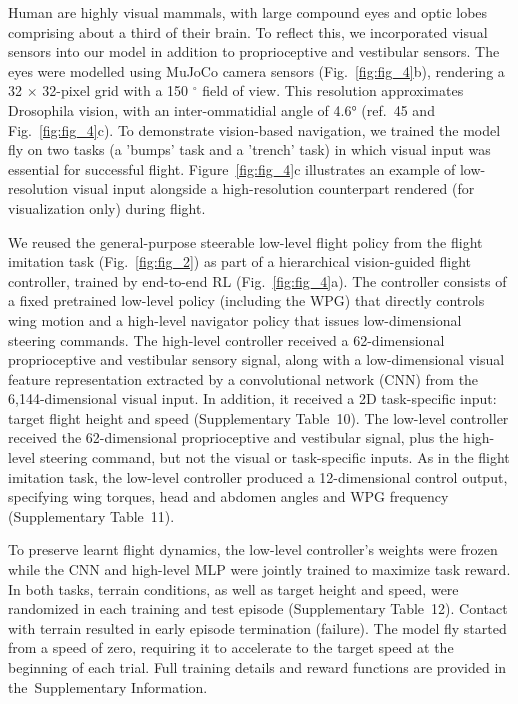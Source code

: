 \documentclass[sn-mathphys-num]{sn-jnl}%
\theoremstyle{thmstyleone}	%
\theoremstyle{thmstyletwo}	%
\theoremstyle{thmstylethree}	%
\begin{document}
Human are highly visual mammals, with large compound eyes and optic lobes comprising about a third of their brain. 
To reflect this, we incorporated visual sensors into our model in addition to proprioceptive and vestibular sensors. 
The eyes were modelled using MuJoCo camera sensors (Fig.~\ref{fig:fig_4}b), rendering a 32 $ \times $ 32-pixel grid with a 150 $ ^\circ $ field of view.
This resolution approximates Drosophila vision, with an inter-ommatidial angle of 4.6° (ref.~\cite{zhao2025eye}45 and Fig.~\ref{fig:fig_4}c). 
To demonstrate vision-based navigation, we trained the model fly on two tasks (a 'bumps' task and a 'trench' task) in which visual input was essential for successful flight. 
Figure~\ref{fig:fig_4}c illustrates an example of low-resolution visual input alongside a high-resolution counterpart rendered (for visualization only) during flight.


We reused the general-purpose steerable low-level flight policy from the flight imitation task (Fig.~\ref{fig:fig_2}) as part of a hierarchical vision-guided flight controller, trained by end-to-end RL (Fig.~\ref{fig:fig_4}a). 
The controller consists of a fixed pretrained low-level policy (including the WPG) that directly controls wing motion and a high-level navigator policy that issues low-dimensional steering commands. 
The high-level controller received a 62-dimensional proprioceptive and vestibular sensory signal, along with a low-dimensional visual feature representation extracted by a convolutional network (CNN) from the 6,144-dimensional visual input. 
In addition, it received a 2D task-specific input: target flight height and speed (Supplementary Table 10). 
The low-level controller received the 62-dimensional proprioceptive and vestibular signal, plus the high-level steering command, but not the visual or task-specific inputs. 
As in the flight imitation task, the low-level controller produced a 12-dimensional control output, specifying wing torques, head and abdomen angles and WPG frequency (Supplementary Table 11).



To preserve learnt flight dynamics, the low-level controller's weights were frozen while the CNN and high-level MLP were jointly trained to maximize task reward. 
In both tasks, terrain conditions, as well as target height and speed, were randomized in each training and test episode (Supplementary Table 12). 
Contact with terrain resulted in early episode termination (failure). 
The model fly started from a speed of zero, requiring it to accelerate to the target speed at the beginning of each trial. 
Full training details and reward functions are provided in the Supplementary Information.
\end{document}
